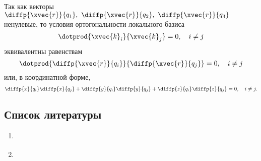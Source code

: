 Так как векторы $\diffp{\xvec{r}}{{q_1}},~\diffp{\xvec{r}}{{q_2}},
~\diffp{\xvec{r}}{{q_3}}$ ненулевые, то условия ортогональности локального базиса
\begin{equation*}
  \dotprod{\xvec{k}_i}{\xvec{k}_j} = 0, \quad i \neq j
\end{equation*}
эквивалентны равенствам
\begin{equation*}
  \dotprod{\diffp{\xvec{r}}{{q_i}}}{\diffp{\xvec{r}}{{q_j}}} = 0,
    \quad i \neq j
\end{equation*}
или, в координатной форме,
\begin{equation}
  \diffp{x}{{q_i}} \diffp{x}{{q_j}} + \diffp{y}{{q_i}} \diffp{y}{{q_j}} +
    \diffp{z}{{q_i}} \diffp{z}{{q_j}} = 0, \quad i \neq j.
\end{equation}

\subsection{Список литературы}
\begin{enumerate}
  \item \cite{lectures}
  \item \cite{lourie}
\end{enumerate}

